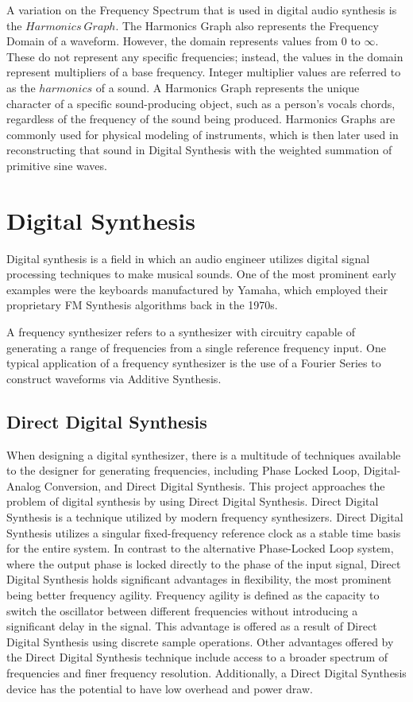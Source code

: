 \documentclass[a4paper,12pt]{report}
\begin{document}
A variation on the Frequency Spectrum that is used in digital audio synthesis is the $Harmonics\ Graph$. The Harmonics Graph also represents the Frequency Domain of a waveform. However, the domain represents values from 0 to $\infty$. These do not represent any specific frequencies; instead, the values in the domain represent multipliers of a base frequency. Integer multiplier values are referred to as the $harmonics$ of a sound. A Harmonics Graph represents the unique character of a specific sound-producing object, such as a person's vocals chords, regardless of the frequency of the sound being produced. Harmonics Graphs are commonly used for physical modeling of instruments, which is then later used in reconstructing that sound in Digital Synthesis with the weighted summation of primitive sine waves.


\section{Digital Synthesis}
\label{subsec:digitalsynth}
Digital synthesis is a field in which an audio engineer utilizes digital signal processing techniques to make musical sounds. One of the most prominent early examples were the keyboards manufactured by Yamaha, which employed their proprietary FM Synthesis algorithms back in the 1970s.

A frequency synthesizer refers to a synthesizer with circuitry capable of generating a range of frequencies from a single reference frequency input. One typical application of a frequency synthesizer is the use of a Fourier Series to construct waveforms via Additive Synthesis.

\subsection{Direct Digital Synthesis}
\label{subsec:directdigitalsynth}
When designing a digital synthesizer, there is a multitude of techniques available to the designer for generating frequencies, including Phase Locked Loop, Digital-Analog Conversion, and Direct Digital Synthesis. This project approaches the problem of digital synthesis by using Direct Digital Synthesis. Direct Digital Synthesis is a technique utilized by modern frequency synthesizers. Direct Digital Synthesis utilizes a singular fixed-frequency reference clock as a stable time basis for the entire system. In contrast to the alternative Phase-Locked Loop system, where the output phase is locked directly to the phase of the input signal, Direct Digital Synthesis holds significant advantages in flexibility, the most prominent being better frequency agility. Frequency agility is defined as the capacity to switch the oscillator between different frequencies without introducing a significant delay in the signal. This advantage is offered as a result of Direct Digital Synthesis using discrete sample operations. Other advantages offered by the Direct Digital Synthesis technique include access to a broader spectrum of frequencies and finer frequency resolution. Additionally, a Direct Digital Synthesis device has the potential to have low overhead and power draw.
\end{document}
